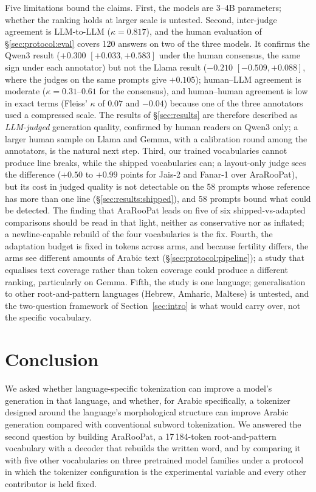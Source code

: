 \documentclass[a4paper,fleqn]{cas-sc}
\begin{document}
Five limitations bound the claims. First, the models are 3--4B parameters; whether the ranking holds at larger scale is untested. Second, inter-judge agreement is LLM-to-LLM ($\kappa = 0.817$), and the human evaluation of \S\ref{sec:protocol:eval} covers 120 answers on two of the three models. It confirms the Qwen3 result ($+0.300$ $[+0.033,+0.583]$ under the human consensus, the same sign under each annotator) but not the Llama result ($-0.210$ $[-0.509,+0.088]$, where the judges on the same prompts give $+0.105$); human--LLM agreement is moderate ($\kappa = 0.31$--$0.61$ for the consensus), and human--human agreement is low in exact terms (Fleiss' $\kappa$ of $0.07$ and $-0.04$) because one of the three annotators used a compressed scale. The results of \S\ref{sec:results} are therefore described as \emph{LLM-judged} generation quality, confirmed by human readers on Qwen3 only; a larger human sample on Llama and Gemma, with a calibration round among the annotators, is the natural next step.
Third, our trained vocabularies cannot produce line breaks, while the shipped vocabularies can; a layout-only judge sees the difference ($+0.50$ to $+0.99$ points for Jais-2 and Fanar-1 over AraRooPat), but its cost in judged quality is not detectable on the 58 prompts whose reference has more than one line (\S\ref{sec:results:shipped}), and 58 prompts bound what could be detected. The finding that AraRooPat leads on five of six shipped-vs-adapted comparisons should be read in that light, neither as conservative nor as inflated; a newline-capable rebuild of the four vocabularies is the fix. Fourth, the adaptation budget is fixed in tokens across arms, and because fertility differs, the arms see different amounts of Arabic text (\S\ref{sec:protocol:pipeline}); a study that equalises text coverage rather than token coverage could produce a different ranking, particularly on Gemma. Fifth, the study is one language; generalisation to other root-and-pattern languages (Hebrew, Amharic, Maltese) is untested, and the two-question framework of Section~\ref{sec:intro} is what would carry over, not the specific vocabulary.

\section{Conclusion}
\label{sec:conclusion}

We asked whether language-specific tokenization can improve a model's generation in that language, and whether, for Arabic specifically, a tokenizer designed around the language's morphological structure can improve Arabic generation compared with conventional subword tokenization. We answered the second question by building AraRooPat, a 17\,184-token root-and-pattern vocabulary with a decoder that rebuilds the written word, and by comparing it with five other vocabularies on three pretrained model families under a protocol in which the tokenizer configuration is the experimental variable and every other contributor is held fixed.
\end{document}
